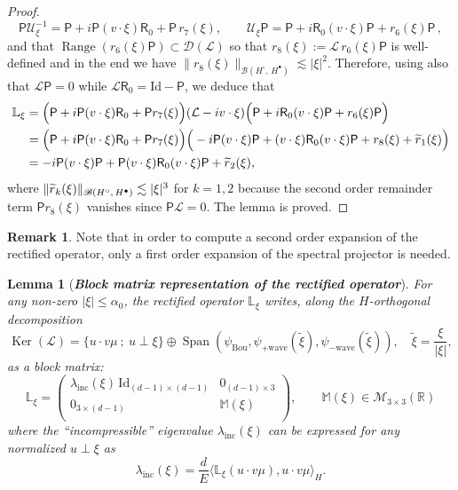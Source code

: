 \documentclass[10pt]{amsart}
\newtheorem{lemm}[theo]{Lemma}\newtheorem{prop}[theo]{Proposition}\newtheorem{coro}[theo]{Corollary}\newtheorem{conj}[theo]{Conjecture}
\theoremstyle{definition}\newtheorem{defi}[theo]{Definition}\newtheorem{rema}[theo]{Remark}\newtheorem{exam}[theo]{Example}\newtheorem{exem}[theo]{Example}\newtheorem{nota}[theo]{Notation}
\DeclareMathOperator{\Span}{Span}
\DeclareMathOperator{\range}{Range}
\DeclareMathOperator{\nul}{Ker}
\newcommand{\Id}{\mathrm{Id}}
\newcommand{\Wave}{\mathrm{wave}}
\newcommand{\Inc}{\mathrm{inc}}
\newcommand{\Bou}{\mathrm{Bou}}
\newcommand{\sfR}{\mathsf{R}}
\newcommand{\R}{\mathbb{R}}
\newcommand{\rectL}{\mathbb{L}}
\newcommand{\rectsL}{\mathbb{M}}
\newcommand{\LL}{\mathcal{L}}
\newcommand{\PP}{\mathsf{P}}
\newcommand{\UU}{\mathcal{U}}
\newcommand{\dom}{\mathscr{D}}
\newcommand{\BBB}{\mathscr{B}}
\newcommand{\MMM}{\mathscr{M}}
\newcommand{\Ss}{H}
\newcommand{\Ssp}{H^{\bullet}}
\newcommand{\Ssm}{H^{\circ}}
\renewcommand*\le{\leqslant}
\let\oldtilde\tilde
\renewcommand*{\tilde}[1]{\mathchoice{\widetilde{#1}}{\widetilde{#1}}{\oldtilde{#1}}{\oldtilde{#1}}}
\begin{document}
\begin{proof}
\begin{equation}\label{eq:expansion_Kato_isomorphismPP}
\PP\UU^{-1}_\xi=\PP + i \PP (v \cdot \xi)\sfR_{0} + \PP\, r_{7}(\xi), \qquad \UU_{\xi}\PP=\PP + i\sfR_{0}(v\cdot\xi)\PP+r_{6}(\xi)\PP\,,
\end{equation}
and that $\range(r_{6}(\xi)\PP) \subset \dom(\LL)$ so that $r_{8}(\xi):=\LL\,r_{6}(\xi)\PP$ is well-defined and in the end we have $\|r_{8}(\xi) \|_{\BBB(\Ssm,\,\Ssp)} \lesssim |\xi|^{2}$. Therefore, using also that $\LL \PP=0$ while $\LL\sfR_{0}=\Id-\PP$, we deduce that
\begin{align*}
\rectL_\xi & = \Big(\PP + i \PP (v \cdot \xi)\sfR_{0} + \PP r_{7}(\xi) \Big) (\LL - i v \cdot \xi) \Big(\PP + i\sfR_{0} (v \cdot \xi) \PP + r_{6}(\xi)\PP\Big) \\
&= \Big(\PP + i \PP (v \cdot \xi)\sfR_{0} + \PP r_{7}(\xi) \Big) \Big(- i \PP (v \cdot \xi) \PP + (v \cdot\xi) \sfR_{0} (v \cdot \xi) \PP + r_{8}(\xi) + \tilde{r}_{1}(\xi)\Big) \\
&= - i \PP (v \cdot \xi) \PP + \PP (v \cdot \xi)\sfR_{0} (v \cdot \xi) \PP + \tilde{r}_{2}(\xi),
\end{align*}
where $\|\tilde{r}_{k}(\xi)\|_{\BBB(\Ssm,\,\Ssp)} \lesssim |\xi|^{3}$ for $k=1,2$ because the second order remainder term $\PP r_{8}(\xi)$ vanishes since $\PP\LL=0$. The lemma is proved.
\end{proof}

\begin{rema}
Note that in order to compute a second order expansion of the rectified operator, only a first order expansion of the spectral projector is needed.
\end{rema}

\begin{lemm}[\emph{\textbf{Block matrix representation of the rectified operator}}]\label{lem:rectified_block_matrix}
For any non-zero $|\xi| \le \alpha_0$, the rectified operator $\rectL_\xi$ writes, along the $\Ss$-orthogonal decomposition
\begin{equation*}
\nul(\LL) = \Big\{ u \cdot v \mu~;~u \perp \xi \Big \} \oplus \Span\left(\psi_{\Bou}, \psi_{+\Wave}\left(\widetilde{\xi} \right), \psi_{-\Wave}\left(\widetilde{\xi} \right) \right), \quad \widetilde{\xi}=\frac{\xi}{|\xi|},
\end{equation*}
as a block matrix:
\begin{equation}\label{eq:LLXIMXI}
\rectL_{\xi} = \left(
\begin{matrix}
\lambda_\Inc(\xi) \, \Id_{(d-1) \times (d-1)} & 0_{(d-1) \times 3} \\
0_{3 \times (d-1)} & \rectsL(\xi) \\
\end{matrix}
\right), \qquad \rectsL(\xi) \in \MMM_{3\times3}(\R)
\end{equation}
where the ``incompressible'' eigenvalue $\lambda_\Inc(\xi)$ can be expressed for any normalized $u \perp \xi$ as
\begin{equation*}
\lambda_\Inc(\xi) = \frac{d}{E} \big\langle \rectL_\xi (u \cdot v \mu), u \cdot v \mu \big\rangle_{\Ss}.
\end{equation*}
\end{lemm}
\end{document}
